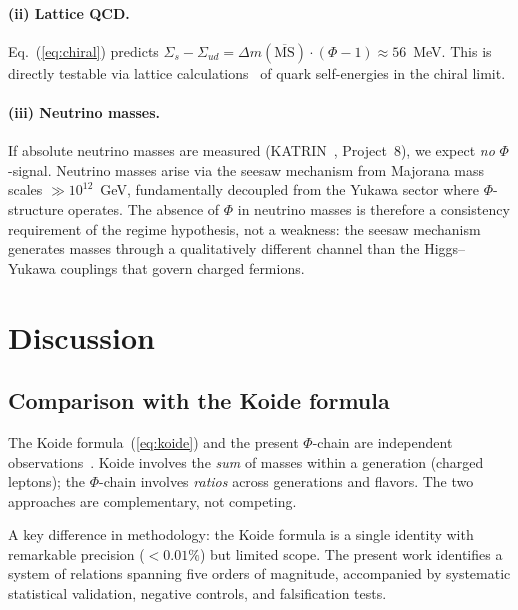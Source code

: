 \documentclass[11pt,a4paper]{article}
\begin{document}
\paragraph{(ii) Lattice QCD.}
Eq.~(\ref{eq:chiral}) predicts
$\Sigma_s - \Sigma_{ud} = \Delta m(\overline{\text{MS}}) \cdot
(\Phi - 1) \approx 56$~MeV.
This is directly testable via lattice calculations~\cite{Durr2008,FlavourLattice2022,Borsanyi2020} of quark
self-energies in the chiral limit.

\paragraph{(iii) Neutrino masses.}
If absolute neutrino masses are measured
(KATRIN~\cite{KATRIN2022}, Project~8), we
expect \emph{no} $\Phi$-signal. Neutrino masses arise via the seesaw
mechanism from Majorana mass scales $\gg 10^{12}$~GeV, fundamentally
decoupled from the Yukawa sector where $\Phi$-structure operates.
The absence of $\Phi$ in neutrino masses is therefore a consistency
requirement of the regime hypothesis, not a weakness: the seesaw
mechanism generates masses through a qualitatively different channel
than the Higgs--Yukawa couplings that govern charged fermions.

\section{Discussion}
\label{sec:discussion}

\subsection{Comparison with the Koide formula}
\label{sec:koide_comparison}

The Koide formula~(\ref{eq:koide}) and the present $\Phi$-chain are
independent observations~\cite{Koide1981,Koide1983}. Koide involves the \emph{sum} of masses
within a generation (charged leptons); the $\Phi$-chain involves
\emph{ratios} across generations and flavors. The two approaches are
complementary, not competing.

A key difference in methodology: the Koide formula is a single
identity with remarkable precision ($< 0.01\%$) but limited scope.
The present work identifies a system of relations spanning five orders
of magnitude, accompanied by systematic statistical validation,
negative controls, and falsification tests.
\end{document}
